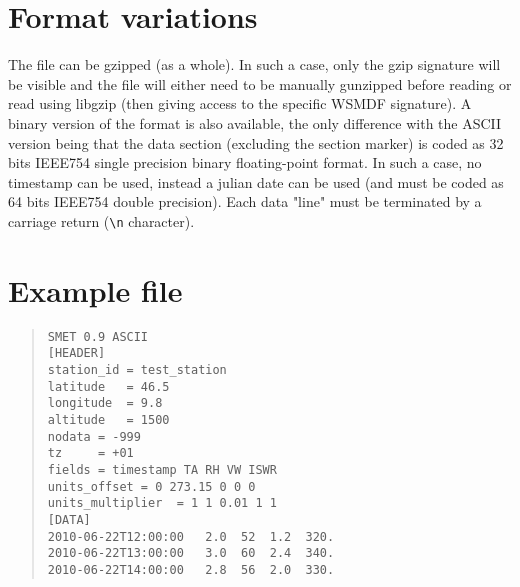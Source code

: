 \documentclass[a4paper,10pt]{article}
\begin{document}
\section{Format variations}
The file can be gzipped (as a whole). In such a case, only the gzip signature will be visible and the file will either need to be manually gunzipped before reading or read using libgzip (then giving access to the specific WSMDF signature). A binary version of the format is also available, the only difference with the ASCII version being that the data section (excluding the section marker) is coded as 32 bits IEEE754 single precision binary floating-point format. In such a case, no timestamp can be used, instead a julian date can be used (and must be coded as 64 bits IEEE754 double precision). Each data "line" must be terminated by a carriage return (\verb '\n' character).

\section{Example file}
\begin{quote} \begin{verbatim}
SMET 0.9 ASCII
[HEADER]
station_id = test_station
latitude   = 46.5
longitude  = 9.8
altitude   = 1500
nodata = -999
tz     = +01
fields = timestamp TA RH VW ISWR
units_offset = 0 273.15 0 0 0
units_multiplier  = 1 1 0.01 1 1
[DATA]
2010-06-22T12:00:00   2.0  52  1.2  320.
2010-06-22T13:00:00   3.0  60  2.4  340.
2010-06-22T14:00:00   2.8  56  2.0  330.
\end{verbatim}\end{quote} 
\end{document}
